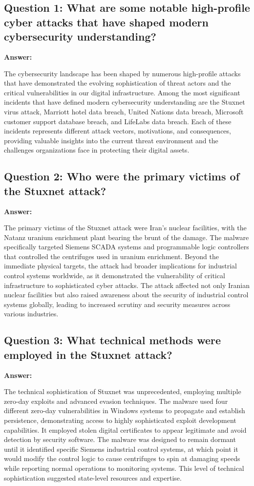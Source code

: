 \documentclass[12pt,a4paper]{article}
\begin{document}
\subsection{Question 1: What are some notable high-profile cyber attacks that have shaped modern cybersecurity understanding?}

\textbf{Answer:}

The cybersecurity landscape has been shaped by numerous high-profile attacks that have demonstrated the evolving sophistication of threat actors and the critical vulnerabilities in our digital infrastructure. Among the most significant incidents that have defined modern cybersecurity understanding are the Stuxnet virus attack, Marriott hotel data breach, United Nations data breach, Microsoft customer support database breach, and LifeLabs data breach. Each of these incidents represents different attack vectors, motivations, and consequences, providing valuable insights into the current threat environment and the challenges organizations face in protecting their digital assets.

\subsection{Question 2: Who were the primary victims of the Stuxnet attack?}

\textbf{Answer:}

The primary victims of the Stuxnet attack were Iran's nuclear facilities, with the Natanz uranium enrichment plant bearing the brunt of the damage. The malware specifically targeted Siemens SCADA systems and programmable logic controllers that controlled the centrifuges used in uranium enrichment. Beyond the immediate physical targets, the attack had broader implications for industrial control systems worldwide, as it demonstrated the vulnerability of critical infrastructure to sophisticated cyber attacks. The attack affected not only Iranian nuclear facilities but also raised awareness about the security of industrial control systems globally, leading to increased scrutiny and security measures across various industries.

\subsection{Question 3: What technical methods were employed in the Stuxnet attack?}

\textbf{Answer:}

The technical sophistication of Stuxnet was unprecedented, employing multiple zero-day exploits and advanced evasion techniques. The malware used four different zero-day vulnerabilities in Windows systems to propagate and establish persistence, demonstrating access to highly sophisticated exploit development capabilities. It employed stolen digital certificates to appear legitimate and avoid detection by security software. The malware was designed to remain dormant until it identified specific Siemens industrial control systems, at which point it would modify the control logic to cause centrifuges to spin at damaging speeds while reporting normal operations to monitoring systems. This level of technical sophistication suggested state-level resources and expertise.
\end{document}
